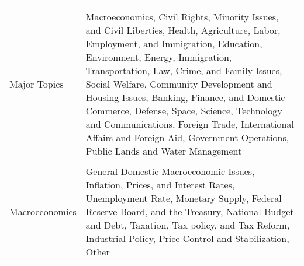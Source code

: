 {\scriptsize
\begin{tabular}{p{}p{}}
  \hline
 &  \\ 
 Major Topics & Macroeconomics, Civil Rights, Minority Issues, and Civil Liberties, Health, Agriculture, Labor, Employment, and Immigration, Education, Environment, Energy, Immigration, Transportation, Law, Crime, and Family Issues, Social Welfare, Community Development and Housing Issues, Banking, Finance, and Domestic Commerce, Defense, Space, Science, Technology and Communications, Foreign Trade, International Affairs and Foreign Aid, Government Operations, Public Lands and Water Management \\ 
   &  \\ 
  Macroeconomics & General Domestic Macroeconomic Issues, Inflation, Prices, and Interest Rates, Unemployment Rate, Monetary Supply, Federal Reserve Board, and the Treasury, National Budget and Debt, Taxation, Tax policy, and Tax Reform, Industrial Policy, Price Control and Stabilization, Other \\ 
   \hline
\end{tabular}
}
